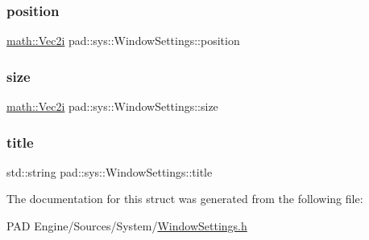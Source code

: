 \mbox{\label{structpad_1_1sys_1_1_window_settings_ab0939a5319fe921d3d4a0ed66e6a1784}} 
\subsubsection{\texorpdfstring{position}{position}}
{\footnotesize\ttfamily \mbox{\hyperlink{namespacepad_1_1math_a808a631a6bccd994f9589d7fb86bad41}{math\+::\+Vec2i}} pad\+::sys\+::\+Window\+Settings\+::position}

\mbox{\label{structpad_1_1sys_1_1_window_settings_ae17577bc348bec80b1084829ac85165e}} 
\subsubsection{\texorpdfstring{size}{size}}
{\footnotesize\ttfamily \mbox{\hyperlink{namespacepad_1_1math_a808a631a6bccd994f9589d7fb86bad41}{math\+::\+Vec2i}} pad\+::sys\+::\+Window\+Settings\+::size}

\mbox{\label{structpad_1_1sys_1_1_window_settings_ab4d283bf8a194b7dc8c6f44187cf3ae5}} 
\subsubsection{\texorpdfstring{title}{title}}
{\footnotesize\ttfamily std\+::string pad\+::sys\+::\+Window\+Settings\+::title}



The documentation for this struct was generated from the following file\+:\begin{DoxyCompactItemize}
\item 
P\+A\+D Engine/\+Sources/\+System/\mbox{\hyperlink{_window_settings_8h}{Window\+Settings.\+h}}\end{DoxyCompactItemize}
